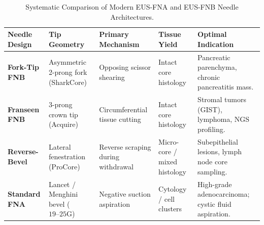 \documentclass[11pt,a4paper]{article}
\begin{document}
\begin{table}[htbp]
\centering
\small
\setlength{\tabcolsep}{3pt}
\caption{Systematic Comparison of Modern EUS-FNA and EUS-FNB Needle Architectures.}
\label{tab:needle_comparison}
\begin{tabular}{p{2.3cm} p{2.8cm} p{3.0cm} p{3.0cm} p{3.4cm}}
\toprule
\textbf{Needle Design} & \textbf{Tip Geometry} & \textbf{Primary Mechanism} & \textbf{Tissue Yield} & \textbf{Optimal Indication} \\
\midrule
\textbf{Fork-Tip FNB} & Asymmetric 2-prong fork (SharkCore) & Opposing scissor shearing & Intact core histology & Pancreatic parenchyma, chronic pancreatitis mass. \\
\addlinespace
\textbf{Franseen FNB} & 3-prong crown tip (Acquire) & Circumferential tissue cutting & Intact core histology & Stromal tumors (GIST), lymphoma, NGS profiling. \\
\addlinespace
\textbf{Reverse-Bevel} & Lateral fenestration (ProCore) & Reverse scraping during withdrawal & Micro-core / mixed histology & Subepithelial lesions, lymph node core sampling. \\
\addlinespace
\textbf{Standard FNA} & Lancet / Menghini bevel ($19\text{--}25\text{G}$) & Negative suction aspiration & Cytology / cell clusters & High-grade adenocarcinoma; cystic fluid aspiration. \\
\bottomrule
\end{tabular}
\end{table}
\end{document}
